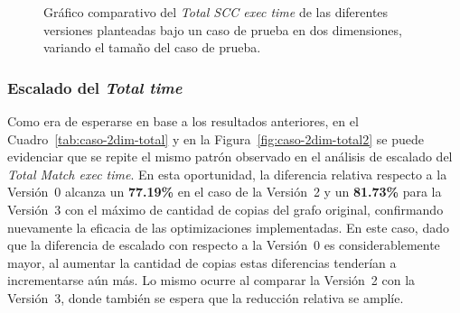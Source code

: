     
\begin{figure}[htbp]
  \centering
  \caption{Gráfico comparativo del \textit{Total SCC exec time} de las diferentes versiones planteadas bajo un caso de prueba en dos dimensiones, variando el tamaño del caso de prueba.}
  \label{fig:caso-2dim-scc2}
\end{figure}



\subsubsection{Escalado del \textit{Total time}}

Como era de esperarse en base a los resultados anteriores, en el Cuadro~\ref{tab:caso-2dim-total} y en la Figura~\ref{fig:caso-2dim-total2} se puede evidenciar que se repite el mismo patrón observado en el análisis de escalado del \textit{Total Match exec time}. En esta oportunidad, la diferencia relativa respecto a la Versión~0 alcanza un \textbf{77{.}19\%} en el caso de la Versión~2 y un \textbf{81{.}73\%} para la Versión~3 con el máximo de cantidad de copias del grafo original, confirmando nuevamente la eficacia de las optimizaciones implementadas. En este caso, dado que la diferencia de escalado con respecto a la Versión~0 es considerablemente mayor, al aumentar la cantidad de copias estas diferencias tenderían a incrementarse aún más. Lo mismo ocurre al comparar la Versión~2 con la Versión~3, donde también se espera que la reducción relativa se amplíe.



